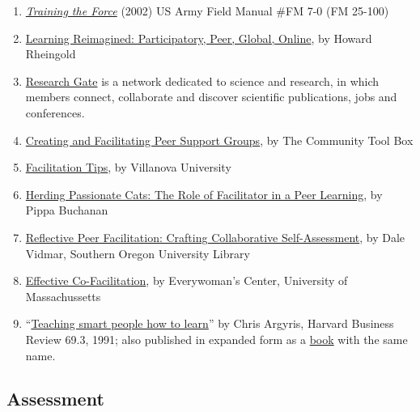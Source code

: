 \begin{enumerate}
{  Pillars of Wikipedia}, from Wikipedia
\item
  \emph{\href{http://www.africom.mil/WO-NCO/DownloadCenter/\%5C40Publications/Training\%20the\%20Force\%20Manual.pdf}{Training
  the Force}} (2002) US Army Field Manual \#FM 7-0 (FM 25-100)
\item
  \href{http://dmlcentral.net/blog/howard-rheingold/learning-reimagined-participatory-peer-global-online}{Learning
  Reimagined: Participatory, Peer, Global, Online}, by Howard Rheingold
\item
  \href{http://www.researchgate.net/}{Research Gate} is a network
  dedicated to science and research, in which members connect,
  collaborate and discover scientific publications, jobs and
  conferences.
\item
  \href{http://ctb.ku.edu/en/tablecontents/section\_1180.aspx}{Creating
  and Facilitating Peer Support Groups}, by The Community Tool Box
\item
  \href{http://www1.villanova.edu/content/villanova/artsci/vcle/resources/toolkit/\_jcr\_content/pagecontent/download\_8/file.res/FacilitationTips.doc}{Facilitation
  Tips}, by Villanova University
\item
  \href{http://pippabuchanan.com/2011/09/04/herding-passionate-cats-the-role-of-facilitator-in-a-peer-learning-process/}{Herding
  Passionate Cats: The Role of Facilitator in a Peer Learning}, by Pippa
  Buchanan
\item
  \href{http://webpages.sou.edu/~vidmar/SOARS2008/vidmar.ppt}{Reflective
  Peer Facilitation: Crafting Collaborative Self-Assessment}, by Dale
  Vidmar, Southern Oregon University Library
\item
  \href{http://www.umass.edu/ewc/ea/Facilitation\%20Skills/important\%20tips.doc}{Effective
  Co-Facilitation}, by Everywoman's Center, University of Massachussetts
\item
  ``\href{www.ncsu.edu/park\_scholarships/pdf/chris\_argyris\_learning.pdf?}{Teaching
  smart people how to learn}'' by Chris Argyris, Harvard Business Review
  69.3, 1991; also published in expanded form as a
  \href{http://www.amazon.com/Teaching-People-Harvard-Business-Classics/dp/1422126005}{book}
  with the same name.
\end{enumerate}
\subsection{Assessment}

